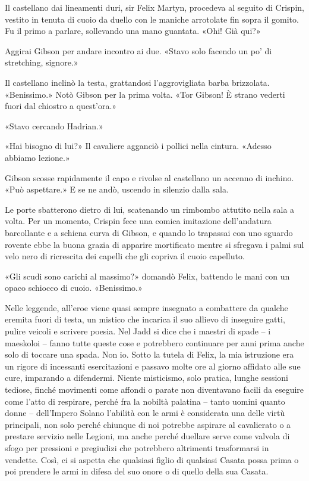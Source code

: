 Il castellano dai lineamenti duri, sir Felix Martyn, procedeva al
seguito di Crispin, vestito in tenuta di cuoio da duello con le maniche
arrotolate fin sopra il gomito. Fu il primo a parlare, sollevando una
mano guantata. «Ohi! Già qui?»

Aggirai Gibson per andare incontro ai due. «Stavo solo facendo un po' di
stretching, signore.»

Il castellano inclinò la testa, grattandosi l'aggrovigliata barba
brizzolata. «Benissimo.» Notò Gibson per la prima volta. «Tor Gibson! È
strano vederti fuori dal chiostro a quest'ora.»

«Stavo cercando Hadrian.»

«Hai bisogno di lui?» Il cavaliere agganciò i pollici nella cintura.
«Adesso abbiamo lezione.»

Gibson scosse rapidamente il capo e rivolse al castellano un accenno di
inchino. «Può aspettare.» E se ne andò, uscendo in silenzio dalla sala.

Le porte sbatterono dietro di lui, scatenando un rimbombo attutito nella
sala a volta. Per un momento, Crispin fece una comica imitazione
dell'andatura barcollante e a schiena curva di Gibson, e quando lo
trapassai con uno sguardo rovente ebbe la buona grazia di apparire
mortificato mentre si sfregava i palmi sul velo nero di ricrescita dei
capelli che gli copriva il cuoio capelluto.

«Gli scudi sono carichi al massimo?» domandò Felix, battendo le mani con
un opaco schiocco di cuoio. «Benissimo.»

Nelle leggende, all'eroe viene quasi sempre insegnato a combattere da
qualche eremita fuori di testa, un mistico che incarica il suo allievo
di inseguire gatti, pulire veicoli e scrivere poesia. Nel Jadd si dice
che i maestri di spade -- i maeskoloi -- fanno tutte queste cose e
potrebbero continuare per anni prima anche solo di toccare una spada.
Non io. Sotto la tutela di Felix, la mia istruzione era un rigore di
incessanti esercitazioni e passavo molte ore al giorno affidato alle sue
cure, imparando a difendermi. Niente misticismo, solo pratica, lunghe
sessioni tediose, finché movimenti come affondi o parate non diventavano
facili da eseguire come l'atto di respirare, perché fra la nobiltà
palatina -- tanto uomini quanto donne -- dell'Impero Solano l'abilità
con le armi è considerata una delle virtù principali, non solo perché
chiunque di noi potrebbe aspirare al cavalierato o a prestare servizio
nelle Legioni, ma anche perché duellare serve come valvola di sfogo per
pressioni e pregiudizi che potrebbero altrimenti trasformarsi in
vendette. Così, ci si aspetta che qualsiasi figlio di qualsiasi Casata
possa prima o poi prendere le armi in difesa del suo onore o di quello
della sua Casata.

